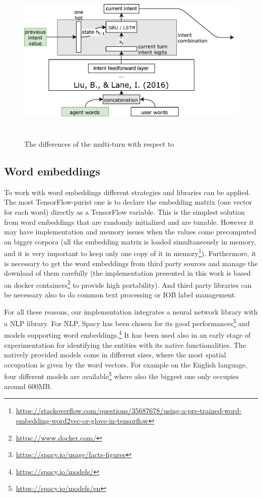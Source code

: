 \begin{figure}[!htbp]
    \centering
    \includegraphics[max width=\linewidth,max height=8cm,keepaspectratio]{figures/approachMultiTurnDifferences}
    \caption{The differences of the multi-turn with respect to~\cite{liu2016attention}}\label{fig:approachMultiTurnDifferences}
\end{figure}

\subsection{Word embeddings}
\label{implementationWV}

To work with word embeddings different strategies and libraries can be applied. The most TensorFlow-purist one is to declare the embedding matrix (one vector for each word) directly as a TensorFlow variable. This is the simplest solution from word embeddings that are randomly initialized and are tunable. However it may have implementation and memory issues when the values come precomputed on bigger corpora (all the embedding matrix is loaded simultaneously in memory, and it is very important to keep only one copy of it in memory\footnote{\url{https://stackoverflow.com/questions/35687678/using-a-pre-trained-word-embedding-word2vec-or-glove-in-tensorflow}}). Furthermore, it is necessary to get the word embeddings from third party sources and manage the download of them carefully (the implementation presented in this work is based on docker containers\footnote{\url{https://www.docker.com/}} to provide high portability). And third party libraries can be necessary also to do common text processing or IOB label management.

For all these reasons, our implementation integrates a neural network library with a NLP library. For NLP, Spacy has been chosen for its good performances\footnote{\url{https://spacy.io/usage/facts-figures}} and models supporting word embeddings.\footnote{\url{https://spacy.io/models/}} It has been used also in an early stage of experimentation for identifying the entities with its native functionalities. The natively provided models come in different sizes, where the most spatial occupation is given by the word vectors. For example on the English language, four different models are available\footnote{\url{https://spacy.io/models/en}} where also the biggest one only occupies around 600MB.

